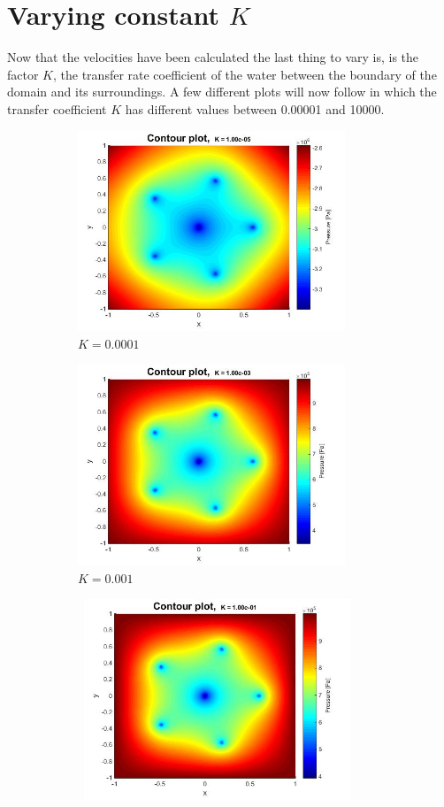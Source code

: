 \documentclass[a4paper]{report}
\begin{document}
\newpage
\section{Varying constant $K$}

Now that the velocities have been calculated the last thing to vary is, is the factor $K$, the transfer rate coefficient of the water between the boundary of the domain and its surroundings. A few different plots will now follow in which the transfer coefficient $K$ has different values between 0.00001 and 10000.\\

\begin{figure}
	\centering
	\begin{subfigure}{.45\textwidth}
		\centering
		\includegraphics[width=8cm]{K0_00001_contour.jpg}
		\caption{$K=0.0001$}
		\label{fig:sub1}
	\end{subfigure}%
	\begin{subfigure}{.45\textwidth}
		\centering
		\includegraphics[width=8cm]{K0_001_contour.jpg}
		\caption{$K=0.001$}
		\label{fig:sub2}
	\end{subfigure}
	\begin{subfigure}{.45\textwidth}
	\centering\
	\includegraphics[width=8cm]{K0_1_contour.jpg}

\end{subfigure}
\end{figure}
\end{document}
